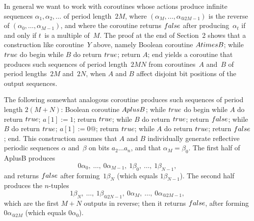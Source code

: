 In general we want to work with coroutines whose actions produce infinite
sequences $\alpha_1,\alpha_2,\ldots$ of period length~$2M$, where
$(\alpha_M,\ldots,\alpha_{@2M-1})$ is the reverse of
$(\alpha_0,\ldots,\alpha_{M-1})$, and where the coroutine
returns $\\{false}$ after producing~$\alpha_t$ if and only
if $t$~is a multiple of~$M$.  The proof at the end of
Section~2 shows that a construction like coroutine~$Y$ above, namely
\beginprogram
\quad Boolean coroutine $\\{AtimesB}$;\cr
\qquad while $\\{true}$ do begin\cr
\qquad\quad while $B$ do return $\\{true}$;\cr
\qquad\quad return $A$;\cr
\qquad\quad end\cr
\endprogram
yields a coroutine that produces such sequences of
period length~$2MN$ from coroutines~$A$ and~$B$ of
period lengths~$2M$ and~$2N$, when $A$ and $B$ affect disjoint bit positions
of the output sequences.

The following somewhat analogous coroutine produces such
sequences of period length $2(M+N)$:
\beginprogram
\quad Boolean coroutine $\\{AplusB}$;\cr
\qquad while $\\{true}$ do begin\cr
\qquad\quad while $A$ do return $\\{true}$;\cr
\qquad\quad $a[1]:=1$; return $\\{true}$;\cr
\qquad\quad while $B$ do return $\\{true}$;\cr
\qquad\quad return $\\{false}$;\cr
\qquad\quad while $B$ do return $\\{true}$;\cr
\qquad\quad $a[1]:=0@$; return $\\{true}$;\cr
\qquad\quad while $A$ do return $\\{true}$;\cr
\qquad\quad return $\\{false}$;\cr
\qquad\quad end\rm.\cr
\endprogram
This construction assumes that $A$ and $B$ individually generate
reflective periodic sequences $\alpha$ and~$\beta$ on bits
$a_2\ldots a_n$, and that $\alpha_M=\beta_0$.  The first half of
\\{AplusB} produces
$$0\alpha_0,\ \ldots,\ 0\alpha_{M-1},\ 1\beta_0,\ \ldots,\ 1\beta_{N-1},$$
and returns $\\{false}$ after forming~$1\beta_N$ (which equals $1\beta_{N-1}$).
The second half produces the $n$-tuples
$$1\beta_N,\ \ldots,\ 1\beta_{@2N-1},\ 0\alpha_M,\ \ldots,\  0\alpha_{@2M-1},$$
which are the first $M+N$ outputs in reverse; then it returns $\\{false}$,
after forming $0\alpha_{@2M}$ (which equals $0\alpha_0$).

